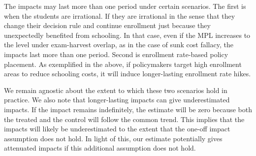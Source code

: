 \documentclass[12pt,letterpaper]{article}
\newcommand{\0}{\ensuremath{\mbox{\boldmath $0$}}}
\begin{document}
The impacts may last more than one period under certain scenarios. The first is when the students are irrational. If they are irrational in the sense that they change their decision rule and continue enrollment just because they unexpectedly benefited from schooling. In that case, even if the MPL increases to the level under exam-harvest overlap, as in the case of sunk cost fallacy, the impacts last more than one period. Second is enrollment rate-based policy placement. As exemplified in the above, if policymakers target high enrollment areas to reduce schooling costs, it will induce longer-lasting enrollment rate hikes. 

We remain agnostic about the extent to which these two scenarios hold in practice. We also note that longer-lasting impacts can give underestimated impacts. If the impact remains indefinitely, the estimate will be zero because both the treated and the control will follow the common trend. This implies that the impacts will likely be underestimated to the extent that the one-off impact assumption does not hold. In light of this, our estimate potentially gives attenuated impacts if this additional assumption does not hold.



\end{document}
